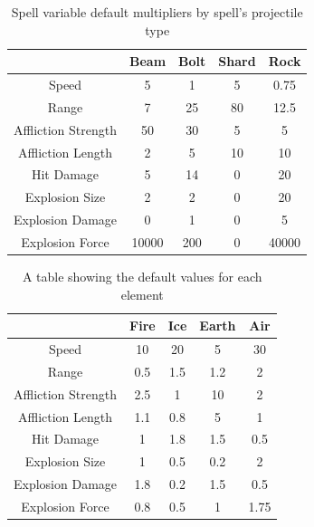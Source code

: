 \documentclass[12pt,a4paper]{report}
\begin{document}
\begin{table}
    \begin{tabular}{|c|c|c|c|c|}
        \hline
                            & Beam & Bolt & Shard & Rock  \\
        \hline
        Speed               & 5    & 1   & 5    & 0.75    \\
        Range               & 7    & 25   & 80    & 12.5    \\
        Affliction Strength & 50   & 30    & 5     & 5     \\
        Affliction Length   & 2    & 5   & 10     & 10     \\
        Hit Damage          & 5   & 14   & 0    & 20    \\
        Explosion Size      & 2    & 2    & 0     & 20     \\
        Explosion Damage    & 0    & 1    & 0     & 5     \\
        Explosion Force     & 10000  & 200 & 0  & 40000 \\
        \hline
    \end{tabular}
    \caption{Spell variable default multipliers by spell's projectile type}
\end{table}

\begin{table}[H]
    \begin{tabular}{|c|c|c|c|c|}
        \hline
                            & Fire & Ice  & Earth & Air  \\
        \hline
        Speed               & 10  & 20   & 5  & 30   \\
        Range               & 0.5 & 1.5  & 1.2  & 2   \\
        Affliction Strength & 2.5 & 1    & 10    & 2 \\
        Affliction Length   & 1.1 & 0.8  & 5    & 1 \\
        Hit Damage          & 1   & 1.8  & 1.5  & 0.5 \\
        Explosion Size      & 1   & 0.5  & 0.2  & 2   \\
        Explosion Damage    & 1.8 & 0.2  & 1.5  & 0.5 \\
        Explosion Force     & 0.8 & 0.5  & 1    & 1.75  \\
        \hline
    \end{tabular}
    \caption{A table showing the default values for each element}
    \label{spellElementVariables}
\end{table}
\end{document}
